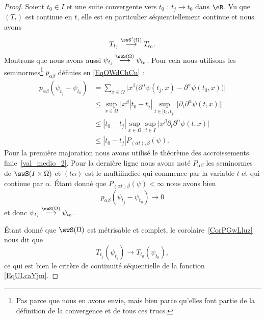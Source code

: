 \begin{proof}
    Soient \( t_0\in I\) et une suite convergente vers \( t_0\) : \( t_j\to t_0\) dans \( \eR\). Vu que \( (T_t)\) est continue en \( t\), elle est en particulier séquentiellement continue et nous avons
    \begin{equation}
        T_{t_j}\stackrel{\swS'(\Omega)}{\longrightarrow}T_{t_0}.
    \end{equation}
    Montrons que nous avons aussi \( \psi_{t_j}\stackrel{\swS(\Omega)}{\longrightarrow}\psi_{t_0}\). Pour cela nous utilisons les seminormes\footnote{Pas parce que nous en avons envie, mais bien parce qu'elles font partie de la définition de la convergence et de tous ces trucs.} \( p_{\alpha\beta}\) définies en \eqref{EqOWdChCu} :
    \begin{subequations}
        \begin{align}
            p_{\alpha\beta}(\psi_{t_j}-\psi_{t_0})&=\sum_{x\in \Omega}\Big| x^{\beta}\big( \partial^{\alpha}\psi(t_j,x)-\partial^{\alpha}\psi(t_0,x) \big)       \Big|\\
            &\leq\sup_{x\in\Omega}\Big|  x^{\beta}| t_0-t_j |\sup_{t\in \mathopen[ t_0 , t_j \mathclose]}\big| \partial_t\partial^{\alpha}\psi(t,x) \big|   \Big|\\
            &\leq| t_0-t_j |\sup_{x\in\Omega}\sup_{t\in I}\big| x^{\beta}\partial_t\partial^{\alpha}\psi(t,x) \big|\\
            &\leq| t_0-t_j |P_{(\alpha t),\beta}(\psi).
        \end{align}
    \end{subequations}
    Pour la première majoration nous avons utilisé le théorème des accroissements finie~\ref{val_medio_2}. Pour la dernière ligne nous avons noté \( P_{\alpha\beta}\) les seminormes de \( \swS(I\times \Omega)\) et \( (t\alpha)\) est le multiiindice qui commence par la variable \( t\) et qui continue par \( \alpha\). Étant donné que \( P_{(\alpha t)\beta}(\psi)<\infty\) nous avons bien
    \begin{equation}
        p_{\alpha\beta}(\psi_{t_j}-\psi_{t_0})\to 0
    \end{equation}
    et donc \( \psi_{t_j}\stackrel{\swS(\Omega)}{\longrightarrow}\psi_{t_0}\).

    Étant donné que \( \swS(\Omega)\) est métrisable et complet, le corolaire~\ref{CorPGwLluz} nous dit que
    \begin{equation}
        T_{t_j}(\psi_{t_j})\to T_{t_0}(\psi_{t_0}),
    \end{equation}
    ce qui est bien le critère de continuité séquentielle de la fonction \eqref{EqULcaYjm}.
\end{proof}

